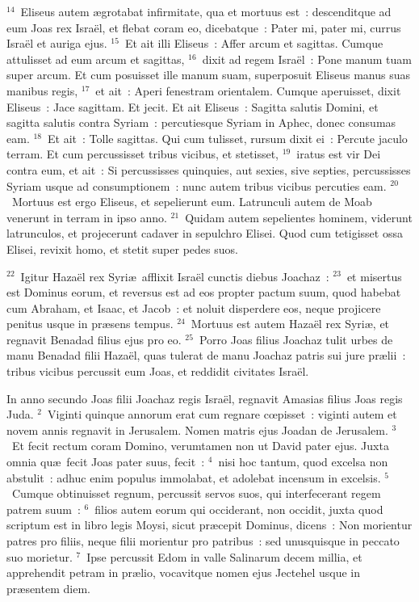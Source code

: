 ${}^{14}$~Eliseus autem \ae grotabat infirmitate, qua et mortuus est~: descenditque ad eum Joas rex Isra\"el, et flebat coram eo, dicebatque~: Pater mi, pater mi, currus Isra\"el et auriga ejus.
${}^{15}$~Et ait illi Eliseus~: Affer arcum et sagittas. Cumque attulisset ad eum arcum et sagittas,
${}^{16}$~dixit ad regem Isra\"el~: Pone manum tuam super arcum. Et cum posuisset ille manum suam, superposuit Eliseus manus suas manibus regis,
${}^{17}$~et ait~: Aperi fenestram orientalem. Cumque aperuisset, dixit Eliseus~: Jace sagittam. Et jecit. Et ait Eliseus~: Sagitta salutis Domini, et sagitta salutis contra Syriam~: percutiesque Syriam in Aphec, donec consumas eam.
${}^{18}$~Et ait~: Tolle sagittas. Qui cum tulisset, rursum dixit ei~: Percute jaculo terram. Et cum percussisset tribus vicibus, et stetisset,
${}^{19}$~iratus est vir Dei contra eum, et ait~: Si percussisses quinquies, aut sexies, sive septies, percussisses Syriam usque ad consumptionem~: nunc autem tribus vicibus percuties eam.
${}^{20}$~Mortuus est ergo Eliseus, et sepelierunt eum. Latrunculi autem de Moab venerunt in terram in ipso anno.
${}^{21}$~Quidam autem sepelientes hominem, viderunt latrunculos, et projecerunt cadaver in sepulchro Elisei. Quod cum tetigisset ossa Elisei, revixit homo, et stetit super pedes suos.


${}^{22}$~Igitur Haza\"el rex Syri\ae\ afflixit Isra\"el cunctis diebus Joachaz~:
${}^{23}$~et misertus est Dominus eorum, et reversus est ad eos propter pactum suum, quod habebat cum Abraham, et Isaac, et Jacob~: et noluit disperdere eos, neque projicere penitus usque in pr\ae sens tempus.
${}^{24}$~Mortuus est autem Haza\"el rex Syri\ae , et regnavit Benadad filius ejus pro eo.
${}^{25}$~Porro Joas filius Joachaz tulit urbes de manu Benadad filii Haza\"el, quas tulerat de manu Joachaz patris sui jure pr\ae lii~: tribus vicibus percussit eum Joas, et reddidit civitates Isra\"el.

\bchapter
\lettrine[lines=3,image=true,loversize=0.05,lraise=-0.03]{I}{}n anno secundo Joas filii Joachaz regis Isra\"el, regnavit Amasias filius Joas regis Juda.
${}^{2}$~Viginti quinque annorum erat cum regnare cœpisset~: viginti autem et novem annis regnavit in Jerusalem. Nomen matris ejus Joadan de Jerusalem.
${}^{3}$~Et fecit rectum coram Domino, verumtamen non ut David pater ejus. Juxta omnia qu\ae\ fecit Joas pater suus, fecit~:
${}^{4}$~nisi hoc tantum, quod excelsa non abstulit~: adhuc enim populus immolabat, et adolebat incensum in excelsis.
${}^{5}$~Cumque obtinuisset regnum, percussit servos suos, qui interfecerant regem patrem suum~:
${}^{6}$~filios autem eorum qui occiderant, non occidit, juxta quod scriptum est in libro legis Moysi, sicut pr\ae cepit Dominus, dicens~: Non morientur patres pro filiis, neque filii morientur pro patribus~: sed unusquisque in peccato suo morietur.
${}^{7}$~Ipse percussit Edom in valle Salinarum decem millia, et apprehendit petram in pr\ae lio, vocavitque nomen ejus Jectehel usque in pr\ae sentem diem.


